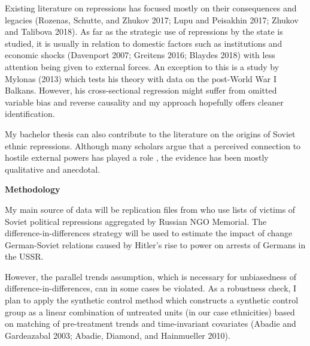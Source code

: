 \noindent Existing literature on repressions has focused mostly on their consequences and legacies (Rozenas, Schutte, and Zhukov 2017; Lupu and Peisakhin 2017; Zhukov and Talibova 2018). As far as the strategic use of repressions by the state is studied, it is usually in relation to domestic factors such as institutions and economic shocks (Davenport 2007; Greitens 2016; Blaydes 2018) with less attention being given to external forces. An exception to this is a study by Mylonas (2013) which tests his theory with data on the post-World War I Balkans. However, his cross-sectional regression might suffer from omitted variable bias and reverse causality and my approach hopefully offers cleaner identification. 

My bachelor thesis can also contribute to the literature on the origins of Soviet ethnic repressions. Although many scholars argue that a perceived connection to hostile external powers has played a role \citep{martin_origins_1998, polian_against_2003}, the evidence has been mostly qualitative and anecdotal. 

\noindent \large{\bf Methodology}

\noindent My main source of data will be replication files from \citet{zhukov_stalins_2018} who use lists of victims of Soviet political repressions aggregated by Russian NGO Memorial. The difference-in-differences strategy will be used to estimate the impact of change German-Soviet relations caused by Hitler’s rise to power on arrests of Germans in the USSR. 

However, the parallel trends assumption, which is necessary for unbiasedness of difference-in-differences, can in some cases be violated. As a robustness check, I plan to apply the synthetic control method which constructs a synthetic control group as a linear combination of untreated units (in our case ethnicities) based on matching of pre-treatment trends and time-invariant covariates %
(Abadie and Gardeazabal 2003; Abadie, Diamond, and Hainmueller 2010). 

